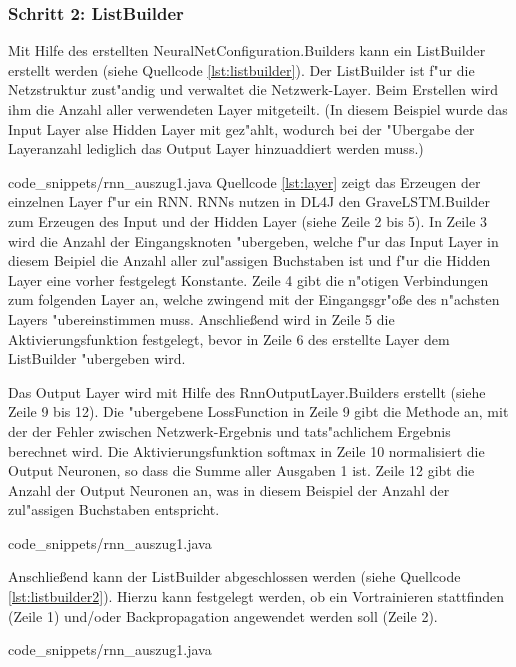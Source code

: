 {\subsubsection{Schritt 2: ListBuilder}
Mit Hilfe des erstellten NeuralNetConfiguration.Builders kann ein ListBuilder erstellt werden (siehe Quellcode \ref{lst:listbuilder}). Der ListBuilder ist f"ur die Netzstruktur zust"andig und verwaltet die Netzwerk-Layer. Beim Erstellen wird ihm die Anzahl aller verwendeten Layer mitgeteilt. (In diesem Beispiel wurde das Input Layer alse Hidden Layer mit gez"ahlt, wodurch bei der "Ubergabe der Layeranzahl lediglich das Output Layer hinzuaddiert werden muss.)


{code_snippets/rnn_auszug1.java}
Quellcode \ref{lst:layer} zeigt das Erzeugen der einzelnen Layer f"ur ein RNN. RNNs nutzen in DL4J den GraveLSTM.Builder zum Erzeugen des Input und der Hidden Layer (siehe Zeile 2 bis 5). In Zeile 3 wird die Anzahl der Eingangsknoten "ubergeben, welche f"ur das Input Layer in diesem Beipiel die Anzahl aller zul"assigen Buchstaben ist und f"ur die Hidden Layer eine vorher festgelegt Konstante. Zeile 4 gibt die n"otigen Verbindungen zum folgenden Layer an, welche zwingend mit der Eingangsgr"o{\ss}e des n"achsten Layers "ubereinstimmen muss. Anschlie{\ss}end wird in Zeile 5 die Aktivierungsfunktion festgelegt, bevor in Zeile 6 des erstellte Layer dem ListBuilder "ubergeben wird.

Das Output Layer wird mit Hilfe des RnnOutputLayer.Builders erstellt (siehe Zeile 9 bis 12). Die "ubergebene LossFunction in Zeile 9 gibt die Methode an, mit der der Fehler zwischen Netzwerk-Ergebnis und tats"achlichem Ergebnis berechnet wird. Die Aktivierungsfunktion \glqq softmax\grqq{} in Zeile 10 normalisiert die Output Neuronen, so dass die Summe aller Ausgaben 1 ist. Zeile 12 gibt die Anzahl der Output Neuronen an, was in diesem Beispiel der Anzahl der zul"assigen Buchstaben entspricht.


{code_snippets/rnn_auszug1.java}

Anschlie{\ss}end kann der ListBuilder abgeschlossen werden (siehe Quellcode \ref{lst:listbuilder2}). Hierzu kann festgelegt werden, ob ein Vortrainieren stattfinden (Zeile 1) und/oder Backpropagation angewendet werden soll (Zeile 2).

{code_snippets/rnn_auszug1.java}

}
